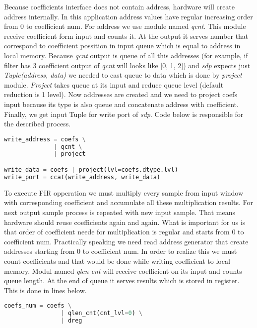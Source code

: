\documentclass[a4paper, 12pt]{article}
\begin{document}
Because coefficients interface does not contain address, hardware will create address internally. In this application address values have regular increasing order from 0 to coefficient num. For address we use module named \textit{qcnt}. This module receive coefficient form input and counts it. At the output it serves number that correspond to coefficient possition in input queue which is equal to address in local memory. Because \textit{qcnt} output is queue of all this addresses (for example, if filter has 3 coefficient output of \textit{qcnt} will looks like [0, 1, 2]) and \textit{sdp} expects just \textit{Tuple(address, data)} we needed to cast queue to data which is done by \textit{project} module. \textit{Project} takes queue at its input and reduce queue level (default reduction is 1 level). Now addresses are created and we need to project coefs input because its type is also queue and concatenate address with coefficient. Finally, we get input Tuple for write port of \textit{sdp}. Code below is responsible for the described process.

\begin{lstlisting}[language=Python, caption=Building write port]
write_address = coefs \
              | qcnt \
              | project

write_data = coefs | project(lvl=coefs.dtype.lvl)
write_port = ccat(write_address, write_data)
\end{lstlisting}

To execute FIR opperation we must multiply every sample from input window with corresponding coefficient and accumulate all these multiplication results. For next output sample process is repeated with new input sample. That means hardware should reuse coefficients again and again. What is important for us is that order of coefficient neede for multiplication is regular and starts from 0 to coefficient num. Practically speaking we need read address generator that create addresses starting from 0 to coefficient num. In order to realize this we must count coefficients and that would be done while writing coefficient to local memory. Modul named \textit{qlen cnt}  will receive coefficient on its input and counts queue length. At the end of queue it serves results which is stored in register. This is done in lines below. 

\begin{lstlisting}[language=Python, caption=Counting coefficients]
	coefs_num = coefs \
                | qlen_cnt(cnt_lvl=0) \
                | dreg
\end{lstlisting}
\end{document}
